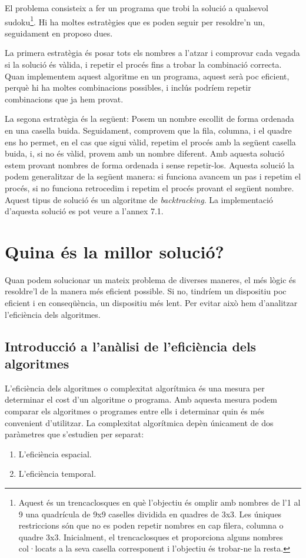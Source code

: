 El problema consisteix a fer un programa que trobi la solució a qualsevol sudoku\footnote{Aquest és un trencaclosques en què l'objectiu és omplir amb nombres de l'1 al 9 una quadrícula de 9x9 caselles dividida en quadres de 3x3. Les úniques restriccions són que no es poden repetir nombres en cap filera, columna o quadre 3x3. Inicialment, el trencaclosques et proporciona alguns nombres col·locats a la seva casella corresponent i l'objectiu és trobar-ne la resta.}. Hi ha moltes estratègies que es poden seguir per resoldre'n un, seguidament en proposo dues. 

La primera estratègia és posar tots els nombres a l'atzar i comprovar cada vegada si la solució és vàlida, i repetir el procés fins a trobar la combinació correcta. Quan implementem aquest algoritme en un programa, aquest serà poc eficient, perquè hi ha moltes combinacions possibles, i inclús podríem repetir combinacions que ja hem provat.

La segona estratègia és la següent: Posem un nombre escollit de forma ordenada en una casella buida. Seguidament, comprovem que la fila, columna, i el quadre ens ho permet, en el cas que sigui vàlid, repetim el procés amb la següent casella buida, i, si no és vàlid, provem amb un nombre diferent. Amb aquesta solució estem provant nombres de forma ordenada i sense repetir-los. Aquesta solució la podem generalitzar de la següent manera: si funciona avancem un pas i repetim el procés, si no funciona retrocedim i repetim el procés provant el següent nombre. Aquest tipus de solució és un algoritme de \textit{backtracking}. La implementació d'aquesta solució es pot veure a l'annex 7.1.

\section{Quina és la millor solució?}
Quan podem solucionar un mateix problema de diverses maneres, el més lògic és resoldre'l de la manera més eficient possible. Si no, tindríem un dispositiu poc eficient i en conseqüència, un dispositiu més lent. Per evitar això hem d'analitzar l'eficiència dels algoritmes.

\subsection{Introducció a l'anàlisi de l'eficiència dels algoritmes}%
L'eficiència dels algoritmes o complexitat algorítmica és una mesura per determinar el cost d'un algoritme o programa. Amb aquesta mesura podem comparar els algoritmes o programes entre ells i determinar quin és més convenient d'utilitzar. La complexitat algorítmica depèn únicament de dos paràmetres que s'estudien per separat:
\begin{enumerate}
    \item L'eficiència espacial.
    \item L'eficiència temporal.
\end{enumerate}

